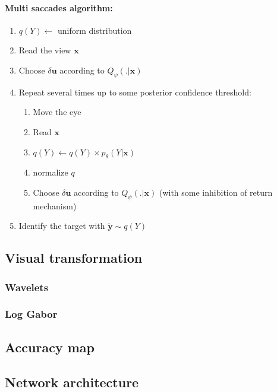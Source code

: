 \paragraph{Multi saccades algorithm:}
\begin{enumerate}
\item $q(Y) \leftarrow$ uniform distribution
\item Read the view $\boldsymbol{x}$
\item Choose $\delta\boldsymbol{u}$ according to $Q_\psi(.|\boldsymbol{x})$
\item Repeat several times up to some posterior confidence threshold:
	\begin{enumerate}
		\item Move the eye
		\item Read $\boldsymbol{x}$
		\item $q(Y) \leftarrow q(Y) \times p_\theta(Y|\boldsymbol{x})$
		\item normalize $q$
		\item Choose $\delta\boldsymbol{u}$ according to $Q_\psi(.|\boldsymbol{x})$ (with some inhibition of return mechanism)
	\end{enumerate}
	\item Identify the target with $\tilde{\boldsymbol{y}} \sim q(Y)$
\end{enumerate}

\subsection{Visual transformation}
\subsubsection{Wavelets}
\subsubsection{Log Gabor}

\subsection{Accuracy map}

\subsection{Network architecture}

